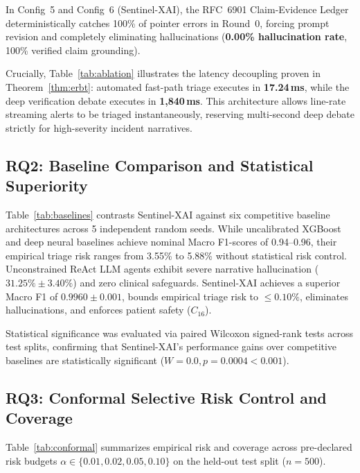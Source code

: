 \documentclass{ieeeaccess}
\begin{document}
In Config~5 and Config~6 (Sentinel-XAI), the RFC~6901 Claim-Evidence Ledger deterministically catches 100\% of pointer errors in Round~0, forcing prompt revision and completely eliminating hallucinations (\textbf{0.00\% hallucination rate}, 100\% verified claim grounding). 

Crucially, Table~\ref{tab:ablation} illustrates the latency decoupling proven in Theorem~\ref{thm:erbt}: automated fast-path triage executes in \textbf{17.24\,ms}, while the deep verification debate executes in \textbf{1,840\,ms}. This architecture allows line-rate streaming alerts to be triaged instantaneously, reserving multi-second deep debate strictly for high-severity incident narratives.

\subsection{RQ2: Baseline Comparison and Statistical Superiority}
Table~\ref{tab:baselines} contrasts Sentinel-XAI against six competitive baseline architectures across 5 independent random seeds. While uncalibrated XGBoost and deep neural baselines achieve nominal Macro F1-scores of 0.94--0.96, their empirical triage risk ranges from 3.55\% to 5.88\% without statistical risk control. Unconstrained ReAct LLM agents exhibit severe narrative hallucination ($31.25\% \pm 3.40\%$) and zero clinical safeguards. Sentinel-XAI achieves a superior Macro F1 of $\mathbf{0.9960 \pm 0.001}$, bounds empirical triage risk to $\mathbf{\le 0.10\%}$, eliminates hallucinations, and enforces patient safety ($C_{16}$).

Statistical significance was evaluated via paired Wilcoxon signed-rank tests across test splits, confirming that Sentinel-XAI's performance gains over competitive baselines are statistically significant ($W = 0.0, p = 0.0004 < 0.001$).

\subsection{RQ3: Conformal Selective Risk Control and Coverage}
Table~\ref{tab:conformal} summarizes empirical risk and coverage across pre-declared risk budgets $\alpha \in \{0.01, 0.02, 0.05, 0.10\}$ on the held-out test split ($n = 500$).
\end{document}
